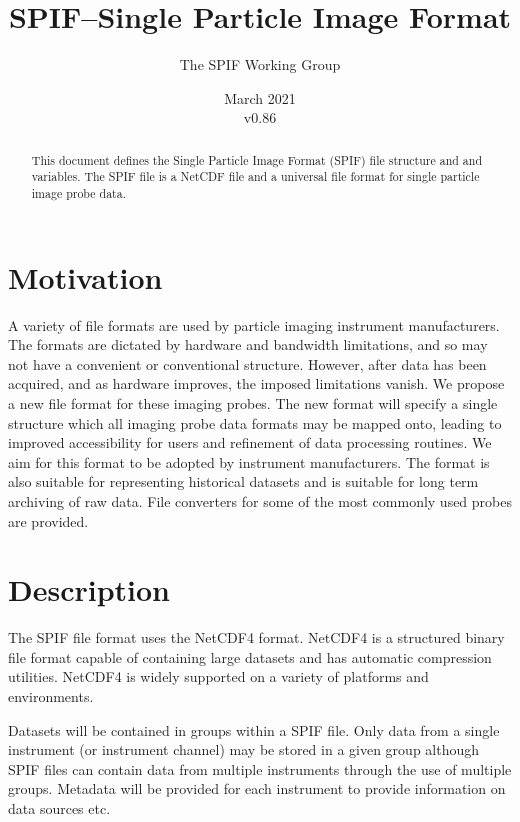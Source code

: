\documentclass[12pt,a4paper]{article}
\begin{document}
\title{SPIF--Single Particle Image Format}
\author{The SPIF Working Group}
\date{March 2021\\v0.86}

\maketitle
\begin{abstract}
This document defines the Single Particle Image Format (SPIF) file structure and and variables. The SPIF file is a NetCDF file and a universal file format for single particle image probe data.
\end{abstract}
\tableofcontents


\section{Motivation}
A variety of file formats are used by particle imaging instrument manufacturers. The formats are dictated by hardware and bandwidth limitations, and so may not have a convenient or conventional structure. However, after data has been acquired, and as hardware improves, the imposed limitations vanish. We propose a new file format for these imaging probes. The new format will specify a single structure which all imaging probe data formats may be mapped onto, leading to improved accessibility for users and refinement of data processing routines. We aim for this format to be adopted by instrument manufacturers. The format is also suitable for representing historical datasets and is suitable for long term archiving of raw data. File converters for some of the most commonly used probes are provided.


\section{Description}
The SPIF file format uses the NetCDF4 format. NetCDF4 is a structured binary file format capable of containing large datasets and has automatic compression utilities. NetCDF4 is widely supported on a variety of platforms and environments. 
\par
Datasets will be contained in groups within a SPIF file. Only data from a single instrument (or instrument channel) may be stored in a given group although SPIF files can contain data from multiple instruments through the use of multiple groups.
Metadata will be provided for each instrument to provide information on data sources etc.
\end{document}
